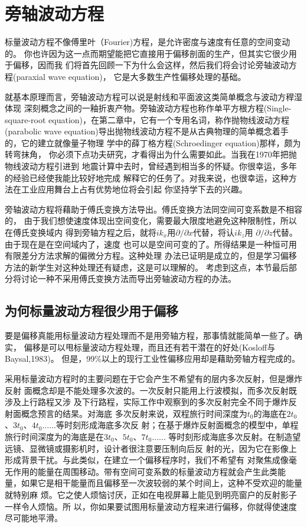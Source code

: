 \section{旁轴波动方程}
标量波动方程不像傅里叶（Fourier)方程，是允许密度与速度有任意的空间变动的。
你也许因为这一点而期望能把它直接用于偏移剖面的生产，但其实它很少用于偏移，因而我
们将首先回顾一下为什么会这样，然后我们将会讨论旁轴波动方程(paraxial wave equation)，
它是大多数生产性偏移处理的基础。

就基本原理而言，旁轴波动方程可以说是射线和平面波这类简单概念与波动方稈湿体现
深刻概念之间的一釉折衷产物。旁轴波动方程也称作单平方根方程(Single-square-root
equation)，在第二章中，它有一个专用名词，称作抛物线波动方程(parabolic wave
equation)导出抛物线波动方程不是从古典物理的简单概念着手的，它的建立就像量子物理
学中的薛丁格方程(Schroedinger equation)那样，颇为转弯抹角，
你必须下点功夫研究，才看得出为什么需要如此。当我在1970年把抛物线波动方程引进到
地震计算中去时，曾经遇到相当多的怀疑。你很幸运，多年的经验已经使我能比较好地完成
解释它的任务了。对我来说，也很幸运，这种方法在工业应用舞台上占有优势地位将会引起
你坚持学下去的兴趣。

旁轴波动方程将藉助于傅氏变换方法导出。傅氏变换方法同空间可变系数是不相容的，
由于我们想使速度体现出空间变化，需要最大限度地避免这种限制性，所以在傅氏变换域内
得到旁轴方程之后，就将$ik_x$用$\partial /\partial x$代替，将认$ik_z$用
$\partial /\partial z$代替。由于现在是在空间域内了，速度
也可以是空间可变的了。所得结果是一种恒可用有限差分方法求解的偏微分方程。这种处理
办法已证明是成立的，但是学习偏移方法的新学生对这种处理还有疑虑，这是可以理解的。
考虑到这点，本节最后部分将讨论一种不采用傅氏变换方法而导出旁轴波动方程的办法。

\subsection{为何标量波动方程很少用于偏移}
要是偏移真能用标量波动方程处理而不是用旁轴方程，那事情就能简单一些了。确实，
偏移是可以甩标量波动方程处理，而且还有若干潜在的好处(Kosloff与Baysal,1983)。
但是，99\%以上的现行工业性偏移应用却是藉助旁轴方程完成的。

采用标量波动方程时的主要问题在于它会产生不希望有的层内多次反射，但是爆炸反射
面概念却是不能处理多次波的。一次反射只能用上行波模拟，而多次反射既涉及上行路程又涉
及下行路程，实际工作中观察到的多次反射完全不同于爆炸反射面概念预言的结杲。对海底
多次反射来说，双程旅行时间深度为$t_0$的海底在$2t_0$、$3t_0$、$4t_0\ldots\ldots$等时刻形成海底多次反
射；在基于爆炸反射面概念的模型中，单程旅行时间深度为的海底是在$3t_0$、$5t_0$、$7t_0\ldots\ldots$
等时刻形成海底多次反射。在制造望远镜、显微镜或摄影机时，设计者很注意要压制向后反
射的光，因为它在影像上形成背景干扰。与此类似，在建立一个偏移程序时，我们不希望有
对聚焦成像毫无作用的能量在周围移动。带有空间可变系数的标量波动方程就会产生此类能
量，如果它是相干能量而且偏移至一次波较弱的某个时间上，这种不受欢迎的能量就特别麻
烦。它之使人烦恼讨厌，正如在电视屏幕上能见到明亮窗户的反射影子一样令人烦恼。所
以，你如果要试图用标量波动方程来进行偏移，你就得使速度尽可能地平滑。

